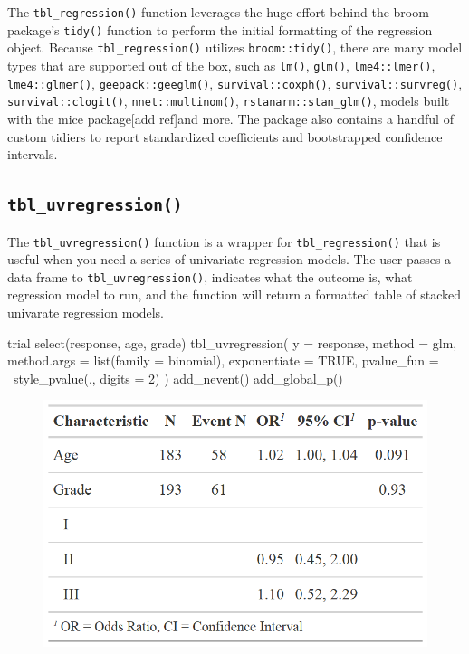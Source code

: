 The \texttt{tbl\_regression()} function leverages the huge effort behind the broom package's \texttt{tidy()} function \citep{broom} to perform the initial formatting of the regression object.
Because \texttt{tbl\_regression()} utilizes \texttt{broom::tidy()}, there are many model types that are supported out of the box, such as \texttt{lm()}, \texttt{glm()}, \texttt{lme4::lmer()}, \texttt{lme4::glmer()}, \texttt{geepack::geeglm()}, \texttt{survival::coxph()}, \texttt{survival::survreg()}, \texttt{survival::clogit()}, \texttt{nnet::multinom()}, \texttt{rstanarm::stan\_glm()}, models built with the mice package[add ref]and more. The  package also contains a handful of custom tidiers to report standardized coefficients and bootstrapped confidence intervals.

\subsection{\texorpdfstring{\texttt{tbl\_uvregression()}}{tbl\_uvregression()}}

The \texttt{tbl\_uvregression()} function is a wrapper for \texttt{tbl\_regression()} that is useful when you need a series of univariate regression models.
The user passes a data frame to \texttt{tbl\_uvregression()}, indicates what the outcome is, what regression model to run, and the function will return a formatted table of stacked univarate regression models.

\begin{example}
trial %
  select(response, age, grade) %
  tbl_uvregression(
    y = response, 
    method = glm,
    method.args = list(family = binomial),
    exponentiate = TRUE,
    pvalue_fun = ~style_pvalue(., digits = 2)
  ) %
  add_nevent() %
  add_global_p()
\end{example}

\begin{figure}[h!]
  \includegraphics[scale=0.28]{uvregression.png}
  \centering
\end{figure}

